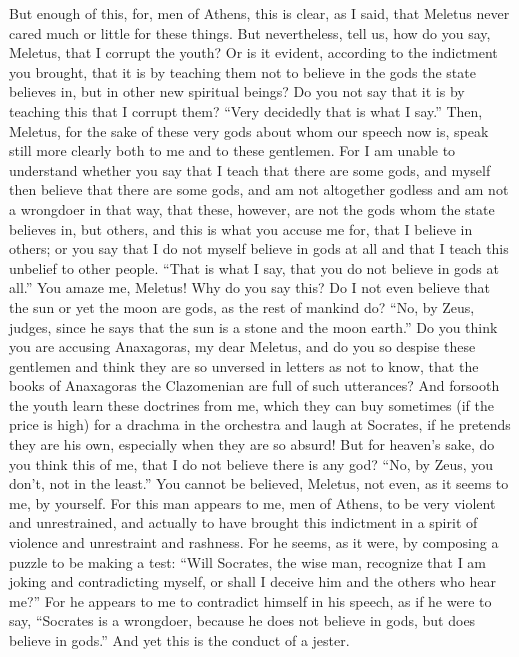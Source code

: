 But enough of this, for, men of Athens, this is clear, as I said, that Meletus never  cared much or little for these things. But nevertheless, tell us, how do you say, Meletus, that I corrupt the youth? Or is it evident, according to the indictment you brought, that it is by teaching them not to believe in the gods the state believes in, but in other new spiritual beings? Do you not say that it is by teaching this that I corrupt them? “Very decidedly that is what I say.” Then, Meletus, for the sake of  these very gods about whom our speech now is, speak still more clearly both to me and to these gentlemen. For I am unable to understand whether you say that I teach that there are some gods, and myself then believe that there are some gods, and am not altogether godless and am not a wrongdoer in that way, that these, however, are not the gods whom the state believes in, but others, and this is what you accuse me for, that I believe in others; or you say that I do not myself believe in gods at all and that I teach this unbelief to other people. “That is what I say, that you do not believe in gods at all.” You amaze me, Meletus! Why do you say this?  Do I not even believe that the sun or yet the moon are gods, as the rest of mankind do? “No, by Zeus, judges, since he says that the sun is a stone and the moon earth.” Do you think you are accusing Anaxagoras, my dear Meletus, and do you so despise these gentlemen and think they are so unversed in letters as not to know, that the books of Anaxagoras the Clazomenian are full of such utterances? And forsooth the youth learn these doctrines from me, which they can buy sometimes  (if the price is high) for a drachma in the orchestra and laugh at Socrates, if he pretends they are his own, especially when they are so absurd! But for heaven's sake, do you think this of me, that I do not believe there is any god? “No, by Zeus, you don't, not in the least.” You cannot be believed, Meletus, not even, as it seems to me, by yourself. For this man appears to me, men of Athens, to be very violent and unrestrained, and actually to have brought this indictment in a spirit of violence and unrestraint and rashness. For he seems,  as it were, by composing a puzzle to be making a test: “Will Socrates, the wise man, recognize that I am joking and contradicting myself, or shall I deceive him and the others who hear me?” For he appears to me to contradict himself in his speech, as if he were to say, “Socrates is a wrongdoer, because he does not believe in gods, but does believe in gods.” And yet this is the conduct of a jester.


